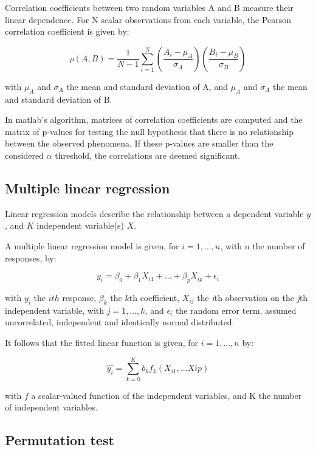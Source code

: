 Correlation coefficients between two random variables A and B measure their linear dependence. For N scalar observations from each variable, the Pearson correlation coefficient is given by:

\begin{equation}
\rho(A, B) = \dfrac{1}{N-1} \sum_{i=1}^N \left( \dfrac{A_i - \mu _A}{\sigma _A}\right) \left( \dfrac{B_i - \mu_B}{\sigma _B}\right)
\end{equation}

with $\mu_A$ and $\sigma_A$ the mean and standard deviation of A, and $\mu_A$ and $\sigma_A$ the mean and standard deviation of B.

In matlab's algorithm, matrices of correlation coefficients are computed and the matrix of p-values for testing the null hypothesis that there is no relationship between the observed phenomena. If these p-values are smaller than the considered $\alpha$ threshold, the correlations are deemed significant.

\subsection{Multiple linear regression}
\label{subsec:subcsectionC}

Linear regression models describe the relationship between a dependent variable $y$, and $K$ independent variable(s) $X$.

A multiple linear regression model is given, for $i=1,...,n$, with n the number of responses, by:

\begin{equation}
y_i=\beta_0 + \beta_1 X_{i1}+...+\beta_p X_{ip}+\epsilon_i
\end{equation}

with $y_i$ the $ith$ response, $\beta_k$ the $k$th coefficient, $X_{ij}$ the \textit{i}th observation on the \textit{j}th independent variable, with $j=1,...,k$, and $\epsilon_i$ the random error term, assumed uncorrelated, independent and identically normal distributed. 

It follows that the fitted linear function is given, for $i=1, ..., n$ by:

\begin{equation}
\hat{y_i}= \sum _{k=0}^K b_k f_k(X_{i1},...X{ip})
\end{equation}

with $f$ a scalar-valued function of the independent variables, and K the number of independent variables.
\subsection{Permutation test}


